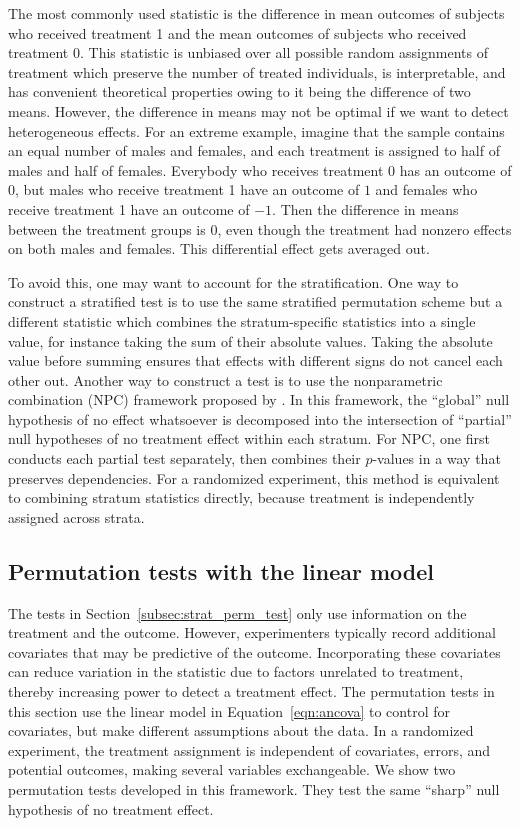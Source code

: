 \documentclass[12pt]{article}
\begin{document}
The most commonly used statistic is the difference in mean outcomes of subjects who received treatment 1 and the mean outcomes of subjects who received treatment 0.  
This statistic is unbiased over all possible random assignments of treatment which preserve the number of treated individuals,
is interpretable, 
and has convenient theoretical properties owing to it being the difference of two means.
However, the difference in means may not be optimal if we want to detect heterogeneous effects.  
For an extreme example, imagine that the sample contains an equal number of males and females, and each treatment is assigned to half of males and half of females.  
Everybody who receives treatment 0 has an outcome of 0, but males who receive treatment 1 have an outcome of $1$ and females who receive treatment 1 have an outcome of $-1$.  
Then the difference in means between the treatment groups is $0$, even though the treatment had nonzero effects on both males and females.  
This differential effect gets averaged out.

To avoid this, one may want to account for the stratification. 
One way to construct a stratified test is to use the same stratified permutation scheme but a different statistic which combines the stratum-specific statistics into a single value, for instance taking the sum of their absolute values.
Taking the absolute value before summing ensures that effects with different signs do not cancel each other out.
Another way to construct a test is to use the nonparametric combination (NPC) framework proposed by \citet{pesarin_permutation_2010}.
In this framework, the ``global'' null hypothesis of no effect whatsoever is decomposed into the intersection of ``partial'' null hypotheses of no treatment effect within each stratum.
For NPC, one first conducts each partial test separately, then combines their $p$-values in a way that preserves dependencies.
For a randomized experiment, this method is equivalent to combining stratum statistics directly, because treatment is independently assigned across strata.


\subsection{Permutation tests with the linear model}\label{subsec:lm_perm_tests}

The tests in Section~\ref{subsec:strat_perm_test} only use information on the treatment and the outcome.
However, experimenters typically record additional covariates that may be predictive of the outcome.
Incorporating these covariates can reduce variation in the statistic due to factors unrelated to treatment, thereby increasing power to detect a treatment effect.
The permutation tests in this section use the linear model in Equation~\ref{eqn:ancova} to control for covariates, but make different assumptions about the data.
In a randomized experiment, the treatment assignment is independent of covariates, errors, and potential outcomes,
making several variables exchangeable.
We show two permutation tests developed in this framework.
They test the same ``sharp'' null hypothesis of no treatment effect.
\end{document}
